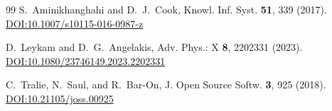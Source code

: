 \documentclass[twocolumn,showpacs,preprintnumbers,amsmath,amssymb,prb,floatfix]{revtex4-2}
\begin{document}
\begin{thebibliography}{99}
S.~Aminikhanghahi and D.~J.~Cook, Knowl. Inf. Syst. \textbf{51}, 339 (2017). \href{https://doi.org/10.1007/s10115-016-0987-z}{DOI:10.1007/s10115-016-0987-z}

D.~Leykam and D.~G.~Angelakis, Adv. Phys.: X \textbf{8}, 2202331 (2023). \href{https://doi.org/10.1080/23746149.2023.2202331}{DOI:10.1080/23746149.2023.2202331}

C.~Tralie, N.~Saul, and R.~Bar-On, J. Open Source Softw. \textbf{3}, 925 (2018). \href{https://doi.org/10.21105/joss.00925}{DOI:10.21105/joss.00925}

\end{thebibliography}
\end{document}
